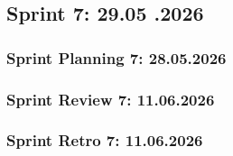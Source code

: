 \subsection{Sprint 7: 29.05 .2026}\label{subsec:sprint-7}

\subsubsection{Sprint Planning 7: 28.05.2026}\label{subsubsec:sprint-planning-7}
\subsubsection{Sprint Review 7: 11.06.2026}\label{subsubsec:sprint-review-7}
\subsubsection{Sprint Retro 7: 11.06.2026}\label{subsubsec:sprint-retro-7}
